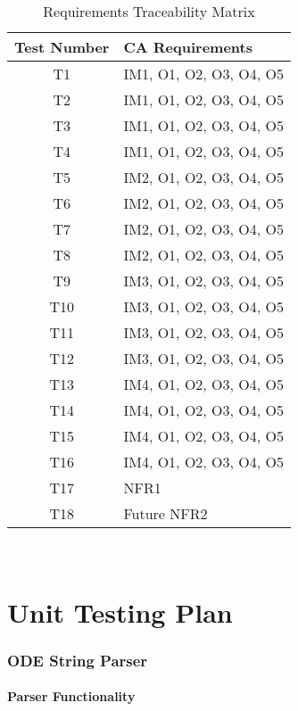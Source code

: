 \documentclass[12pt, titlepage]{article}
\begin{document}
\begin{table} [H]
  \caption{Requirements Traceability Matrix}
  \label{Table:Table_Traceability}  
\begin{tabular}{|c|p{8cm}|}
  \hline	
  \textbf{Test Number} & \textbf{CA Requirements}\\
  \hline 
   T1& IM1, O1, O2, O3, O4, O5\\ \hline
   T2& IM1, O1, O2, O3, O4, O5\\ \hline
   T3& IM1, O1, O2, O3, O4, O5\\ \hline
   T4& IM1, O1, O2, O3, O4, O5\\ \hline
   T5& IM2, O1, O2, O3, O4, O5\\ \hline
   T6& IM2, O1, O2, O3, O4, O5\\ \hline
   T7& IM2, O1, O2, O3, O4, O5\\ \hline
   T8& IM2, O1, O2, O3, O4, O5\\ \hline
   T9& IM3, O1, O2, O3, O4, O5\\ \hline
   T10& IM3, O1, O2, O3, O4, O5\\ \hline
   T11& IM3, O1, O2, O3, O4, O5\\ \hline
   T12& IM3, O1, O2, O3, O4, O5\\ \hline
   T13& IM4, O1, O2, O3, O4, O5\\ \hline
   T14& IM4, O1, O2, O3, O4, O5\\ \hline
   T15& IM4, O1, O2, O3, O4, O5\\ \hline
   T16& IM4, O1, O2, O3, O4, O5\\ \hline
   T17& NFR1\\ \hline
   T18& Future NFR2\\ \hline

\end{tabular}\\
\end{table}
				
\section{Unit Testing Plan}
		

\subsubsection{ODE String Parser}

\paragraph{Parser Functionality}
\end{document}
